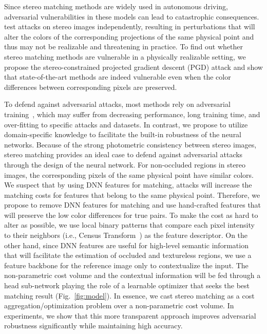 \documentclass[10pt,twocolumn,letterpaper]{article}
\begin{document}
Since stereo matching methods are widely used in autonomous driving, adversarial vulnerabilities in these models can lead to catastrophic consequences. \cite{wong2021stereopagnosia} test attacks on stereo images independently, resulting in perturbations that will alter the colors of the corresponding projections of the same physical point and thus may not be realizable and threatening in practice. To find out whether stereo matching methods are vulnerable in a physically realizable setting, we propose the stereo-constrained projected gradient descent (PGD) attack and show that state-of-the-art methods are indeed vulnerable even when the color differences between corresponding pixels are preserved.

To defend against adversarial attacks, most methods rely on adversarial training~\cite{PGD}, which may suffer from decreasing performance, long training time, and over-fitting to specific attacks and datasets. In contrast, we propose to utilize domain-specific knowledge to facilitate the built-in robustness of the neural networks. Because of the strong photometric consistency between stereo images, stereo matching provides an ideal case to defend against adversarial attacks through the design of the neural network. For non-occluded regions in stereo images, the corresponding pixels of the same physical point have similar colors. We suspect that by using DNN features for matching, attacks will increase the matching costs for features that belong to the same physical point. Therefore, we propose to remove DNN features for matching and use hand-crafted features that will preserve the low color differences for true pairs. To make the cost as hard to alter as possible, we use local binary patterns that compare each pixel intensity to their neighbors (i.e., Census Transform~\cite{hirschmuller2008evaluation,bleyer2010does}) as the feature descriptor. On the other hand, since DNN features are useful for high-level semantic information that will facilitate the estimation of occluded and textureless regions, we use a feature backbone for the reference image only to contextualize the input. The non-parametric cost volume and the contextual information will be fed through a head sub-network playing the role of a learnable optimizer that seeks the best matching result (Fig.~\ref{fig:model}). In essence, we cast stereo matching as a cost aggregation/optimization problem over a non-parametric cost volume. In experiments, we show that this more transparent approach improves adversarial robustness significantly while maintaining high accuracy. 
\end{document}
